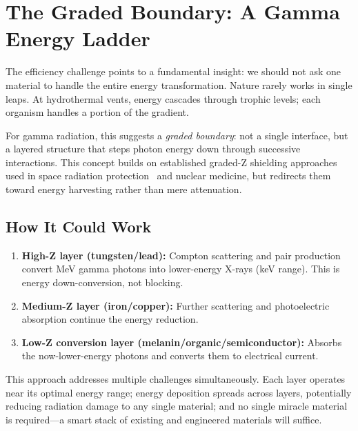 \documentclass[12pt]{article}
\begin{document}
\section{The Graded Boundary: A Gamma Energy Ladder}
\label{sec:graded}

The efficiency challenge points to a fundamental insight: we should not ask one material
to handle the entire energy transformation. Nature rarely works in single leaps. At
hydrothermal vents, energy cascades through trophic levels; each organism handles a
portion of the gradient.

For gamma radiation, this suggests a \emph{graded boundary}: not a single interface, but
a layered structure that steps photon energy down through successive interactions. This
concept builds on established graded-Z shielding approaches used in space radiation
protection~\cite{atwell2013} and nuclear medicine, but redirects them toward energy
harvesting rather than mere attenuation.

\subsection*{How It Could Work}

\begin{enumerate}
    \item \textbf{High-Z layer (tungsten/lead):} Compton scattering and pair production
    convert MeV gamma photons into lower-energy X-rays (keV range). This is energy
    down-conversion, not blocking.

    \item \textbf{Medium-Z layer (iron/copper):} Further scattering and photoelectric
    absorption continue the energy reduction.

    \item \textbf{Low-Z conversion layer (melanin/organic/semiconductor):} Absorbs the
    now-lower-energy photons and converts them to electrical current.
\end{enumerate}

This approach addresses multiple challenges simultaneously. Each layer operates near its
optimal energy range; energy deposition spreads across layers, potentially reducing
radiation damage to any single material; and no single miracle material is required---a
smart stack of existing and engineered materials will suffice.
\end{document}
